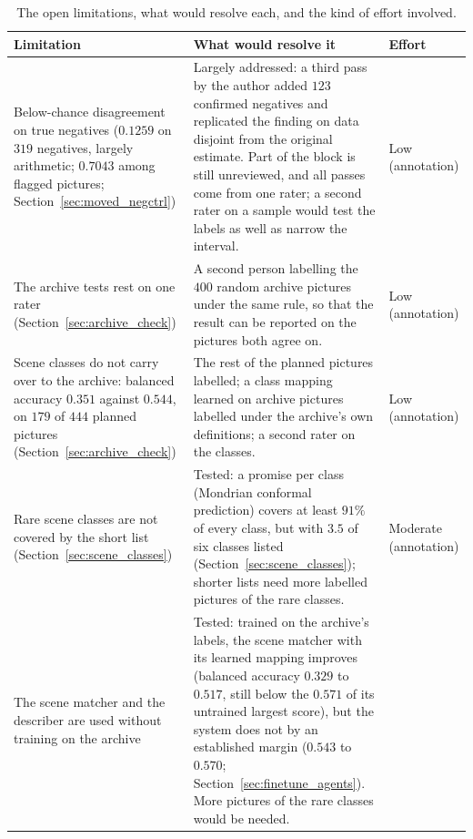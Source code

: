 \documentclass[12pt,a4paper]{report}
\begin{document}
\begin{table}[!htbp]
\centering
\caption[The open limitations and what would resolve them]{The open limitations, what would resolve each, and the kind of effort involved.}
\label{tab:future_work}
\footnotesize
\begin{tabular}{>{\raggedright\arraybackslash}p{3.9cm} >{\raggedright\arraybackslash}p{7.3cm} >{\raggedright\arraybackslash}p{2.2cm}}
\toprule
\textbf{Limitation} & \textbf{What would resolve it} & \textbf{Effort} \\
\midrule

Below-chance disagreement on true negatives ($0.1259$ on $319$ negatives, largely arithmetic; $0.7043$ among flagged pictures; Section~\ref{sec:moved_negctrl}) &
Largely addressed: a third pass by the author added $123$ confirmed negatives and replicated the finding on data disjoint from the original estimate. Part of the block is still unreviewed, and all passes come from one rater; a second rater on a sample would test the labels as well as narrow the interval. &
Low (annotation) \\
\addlinespace
The archive tests rest on one rater (Section~\ref{sec:archive_check}) &
A second person labelling the $400$ random archive pictures under the same rule, so that the result can be reported on the pictures both agree on. &
Low (annotation) \\
\addlinespace
Scene classes do not carry over to the archive: balanced accuracy $0.351$ against $0.544$, on $179$ of $444$ planned pictures (Section~\ref{sec:archive_check}) &
The rest of the planned pictures labelled; a class mapping learned on archive pictures labelled under the archive's own definitions; a second rater on the classes. &
Low (annotation) \\
\addlinespace
Rare scene classes are not covered by the short list (Section~\ref{sec:scene_classes}) &
Tested: a promise per class (Mondrian conformal prediction) covers at least $91\%$ of every class, but with $3.5$ of six classes listed (Section~\ref{sec:scene_classes}); shorter lists need more labelled pictures of the rare classes. &
Moderate (annotation) \\
\addlinespace
The scene matcher and the describer are used without training on the archive &
Tested: trained on the archive's labels, the scene matcher with its learned mapping improves (balanced accuracy $0.329$ to $0.517$, still below the $0.571$ of its untrained largest score), but the system does not by an established margin ($0.543$ to $0.570$; Section~\ref{sec:finetune_agents}). More pictures of the rare classes would be needed. &

\end{tabular}
\end{table}
\end{document}
